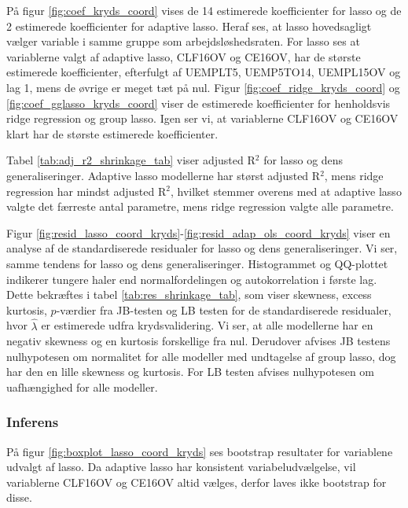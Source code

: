 På figur \ref{fig:coef_kryds_coord} vises de 14 estimerede koefficienter for lasso og de 2 estimerede koefficienter for adaptive lasso.
Heraf ses, at lasso hovedsagligt vælger variable i samme gruppe som arbejdsløshedsraten.
For lasso ses at variablerne valgt af adaptive lasso, \textcolor{blue3}{CLF16OV} og \textcolor{blue3}{CE16OV}, har de største estimerede koefficienter, efterfulgt af \textcolor{blue3}{UEMPLT5}, \textcolor{blue3}{UEMP5TO14}, \textcolor{blue3}{UEMPL15OV} og \textcolor{blue3}{lag 1}, mens de øvrige er meget tæt på nul. 
Figur \ref{fig:coef_ridge_kryds_coord} og \ref{fig:coef_gglasso_kryds_coord} viser de estimerede koefficienter for henholdsvis ridge regression og group lasso.
Igen ser vi, at variablerne \textcolor{blue3}{CLF16OV} og \textcolor{blue3}{CE16OV} klart har de største estimerede koefficienter.    
%


Tabel \ref{tab:adj_r2_shrinkage_tab} viser adjusted R$^2$ for lasso og dens generaliseringer.
Adaptive lasso modellerne har størst adjusted R$^2$, mens ridge regression har mindst adjusted R\(^2\), hvilket stemmer overens med at adaptive lasso valgte det færreste antal parametre, mens ridge regression valgte alle parametre. 


Figur \ref{fig:resid_lasso_coord_kryds}-\ref{fig:resid_adap_ols_coord_kryds} viser en analyse af de standardiserede residualer for lasso og dens generaliseringer. 
Vi ser, samme tendens for lasso og dens generaliseringer. Histogrammet og QQ-plottet indikerer tungere haler end normalfordelingen og autokorrelation i første lag.
Dette bekræftes i tabel \ref{tab:res_shrinkage_tab}, som viser skewness, excess kurtosis, $p$-værdier fra JB-testen og LB testen for de standardiserede residualer, hvor $\widehat{\lambda}$ er estimerede udfra krydsvalidering.  
Vi ser, at alle modellerne har en negativ skewness og en kurtosis forskellige fra nul. 
Derudover afvises JB testens nulhypotesen om normalitet for alle modeller med undtagelse af group lasso, dog har den en lille skewness og kurtosis.
For LB testen afvises nulhypotesen om uafhængighed for alle modeller.

\subsubsection{Inferens}
På figur \ref{fig:boxplot_lasso_coord_kryds} ses bootstrap resultater for variablene udvalgt af lasso.
Da adaptive lasso har konsistent variabeludvælgelse, vil variablerne \textcolor{blue3}{CLF16OV} og \textcolor{blue3}{CE16OV} altid vælges, derfor laves ikke bootstrap for disse.

